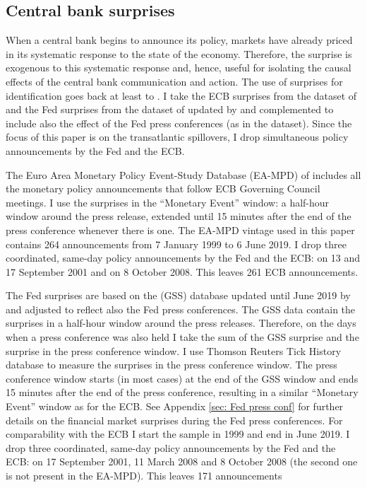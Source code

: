 \documentclass[a4paper,12pt]{article}
\begin{document}
\subsection{Central bank surprises}

When a central bank begins to announce its policy, markets have already priced in its systematic response
to the state of the economy. 
Therefore, the surprise is exogenous to this systematic response and, hence, useful for isolating the causal effects of the central bank communication and action.
The use of surprises for identification goes back at least to \cite{Kuttner_2001}. I
take the ECB surprises from the dataset of \cite{Altavilla_etal_2019}
and the Fed surprises from the dataset of \cite{Gurkaynak_Sack_Swanson_2005a} updated by \cite{Gurkaynak_Karasoy_Lee_2022} and
complemented to include also the effect of the Fed press conferences (as in the \citealt{Altavilla_etal_2019} dataset).
Since the focus of this paper is on the transatlantic spillovers, I drop simultaneous policy announcements
by the Fed and the ECB.

The Euro Area Monetary Policy Event-Study Database (EA-MPD) of \cite{Altavilla_etal_2019}
includes all the monetary policy announcements that follow ECB Governing Council meetings.
I use the surprises in the ``Monetary Event'' window: a half-hour window around the press release, extended until 15 minutes after the end of the press conference whenever there is one.
The EA-MPD vintage used in this paper contains 264 announcements from 7 January 1999 to 6 June 2019. I drop three coordinated, same-day policy announcements by the Fed and the ECB: on 13 and 17 September 2001 and on 8 October 2008. This leaves 261 ECB announcements.

The Fed surprises are based on the \cite{Gurkaynak_Sack_Swanson_2005a} (GSS) database
updated until June 2019 by \cite{Gurkaynak_Karasoy_Lee_2022}
and adjusted to reflect also the Fed press conferences.
The GSS data contain the surprises in a half-hour window around the press releases.
Therefore, on the days when a press conference was also held I take the sum of the GSS surprise and the surprise in the press conference window.
I use Thomson Reuters Tick History database to measure
the surprises in the press conference window. 
The press conference window starts (in most cases) at the end of the GSS window and 
ends 15 minutes after the end of the press conference,
resulting in a similar ``Monetary Event'' window as for the ECB.
See Appendix \ref{sec: Fed press conf} for further details on the financial market surprises during the Fed press conferences.
For comparability with the ECB I start the sample in 1999 and end in June 2019. I drop three coordinated, same-day policy announcements by the Fed and the ECB: on 17 September 2001, 11 March 2008 and 8 October 2008 (the second one is not present in the EA-MPD). This leaves 171 announcements
\end{document}

